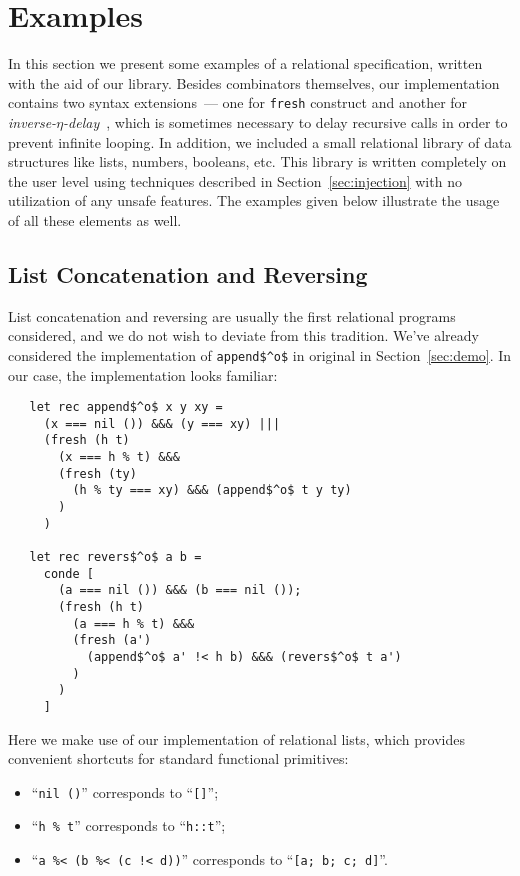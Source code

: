 \section{Examples}
\label{sec:examples}

In this section we present some examples of a relational specification, written with the aid of our library.
Besides \miniKanren combinators themselves, our implementation contains two syntax extensions~--- one
for \lstinline{fresh} construct and another for \emph{inverse-$\eta$-delay}~\cite{MicroKanren}, which is
sometimes necessary to delay recursive calls in order to prevent infinite looping. In addition, we included a
small relational library of data structures like lists, numbers, booleans, etc. This library is written
completely on the user level using techniques described in Section~\ref{sec:injection} with no utilization
of any unsafe features. The examples given below illustrate the usage of all these elements as well.

\subsection{List Concatenation and Reversing}

List concatenation and reversing are usually the first relational programs considered, and we do not wish
to deviate from this tradition. We've already considered the implementation of \lstinline{append$^o$} in
original \miniKanren in Section~\ref{sec:demo}. In our case, the implementation looks familiar:

\begin{lstlisting}
   let rec append$^o$ x y xy =
     (x === nil ()) &&& (y === xy) |||
     (fresh (h t)
       (x === h % t) &&&
       (fresh (ty)
         (h % ty === xy) &&& (append$^o$ t y ty)
       )
     )

   let rec revers$^o$ a b =
     conde [
       (a === nil ()) &&& (b === nil ());
       (fresh (h t)
         (a === h % t) &&&
         (fresh (a')
           (append$^o$ a' !< h b) &&& (revers$^o$ t a')
         )
       )
     ]
\end{lstlisting}

Here we make use of our implementation of relational lists, which provides convenient shortcuts for
standard functional primitives:

\begin{itemize}
  \item ``\lstinline{nil ()}'' corresponds to ``\lstinline{[]}'';
  \item ``\lstinline{h % t}'' corresponds to ``\lstinline{h::t}'';
  \item ``\lstinline{a %< (b %< (c !< d))}'' corresponds to ``\lstinline{[a; b; c; d]}''.
\end{itemize}

